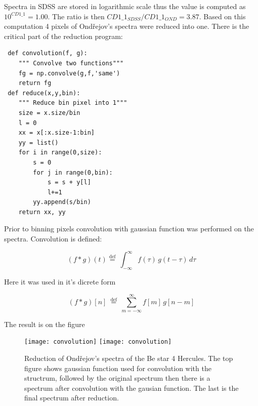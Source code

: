 Spectra in SDSS are stored in logarithmic scale thus the value is
computed as $ 10^{CD1\_1} = 1.00$. The ratio is then
$CD1\_1_{SDSS}/CD1\_1_{OND} = 3.87$. Based on this computation 4
pixels of Ondřejov's spectra were reduced into one. There is the
critical part of the reduction program:

\begin{lstlisting}
 def convolution(f, g):
    """ Convolve two functions"""
    fg = np.convolve(g,f,'same')
    return fg
 def reduce(x,y,bin):
    """ Reduce bin pixel into 1"""
    size = x.size/bin
    l = 0
    xx = x[:x.size-1:bin]
    yy = list()
    for i in range(0,size):
        s = 0
        for j in range(0,bin):
            s = s + y[l]
            l+=1
        yy.append(s/bin)
    return xx, yy
\end{lstlisting}

Prior to binning pixels convolution with gaussian function was
performed on the spectra. Convolution is defined:

\begin{equation}
  \label{eq:convolution}
 (f * g )(t) \stackrel{\mathrm{def}}{=}\ \int_{-\infty}^{\infty} f(\tau)\, g(t - \tau)\, d\tau
\end{equation}
 
Here it was used in it's dicrete form

\begin{equation}
  \label{eq:discreteConvolution}
  (f * g)[n]\ \stackrel{\mathrm{def}}{=}\ \sum_{m=-\infty}^{\infty} f[m]\, g[n - m]
\end{equation}



The result is on the figure


    \begin{figure}[!htbp]
      \begin{center}
        \leavevmode
        \ifpdf
        \texttt{[image: convolution]}
        \else
        \texttt{[image: convolution]}
        \fi
        \caption{Reduction of Ondřejov's spectra of the Be star 4
          Hercules. The top figure shows gaussian function used for
          convolution with the structrum, followed by the original
          spectrum then there is a spectrum after convolution with the
          gausian function. The last is the final spectrum after
          reduction.}
        \label{FigReduction}
      \end{center}
    \end{figure}

\clearpage




